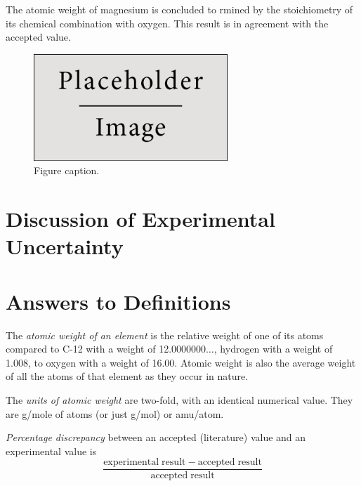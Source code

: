 \documentclass{article}
\begin{document}
The atomic weight of magnesium is concluded to rmined by the stoichiometry of its chemical combination with oxygen. This result is in agreement with the accepted value.

\begin{figure}[h]
\begin{center}
\includegraphics[width=0.65\textwidth]{placeholder} %
\caption{Figure caption.}
\end{center}
\end{figure}


\section{Discussion of Experimental Uncertainty}



\section{Answers to Definitions}

\begin{enumerate}
\begin{item}
The \emph{atomic weight of an element} is the relative weight of one of its atoms compared to C-12 with a weight of 12.0000000$\ldots$, hydrogen with a weight of 1.008, to oxygen with a weight of 16.00. Atomic weight is also the average weight of all the atoms of that element as they occur in nature.
\end{item}
\begin{item}
The \emph{units of atomic weight} are two-fold, with an identical numerical value. They are g/mole of atoms (or just g/mol) or amu/atom.
\end{item}
\begin{item}
\emph{Percentage discrepancy} between an accepted (literature) value and an experimental value is
\begin{equation*}
\frac{\mathrm{experimental\;result} - \mathrm{accepted\;result}}{\mathrm{accepted\;result}}
\end{equation*}
\end{item}
\end{enumerate}
\end{document}
